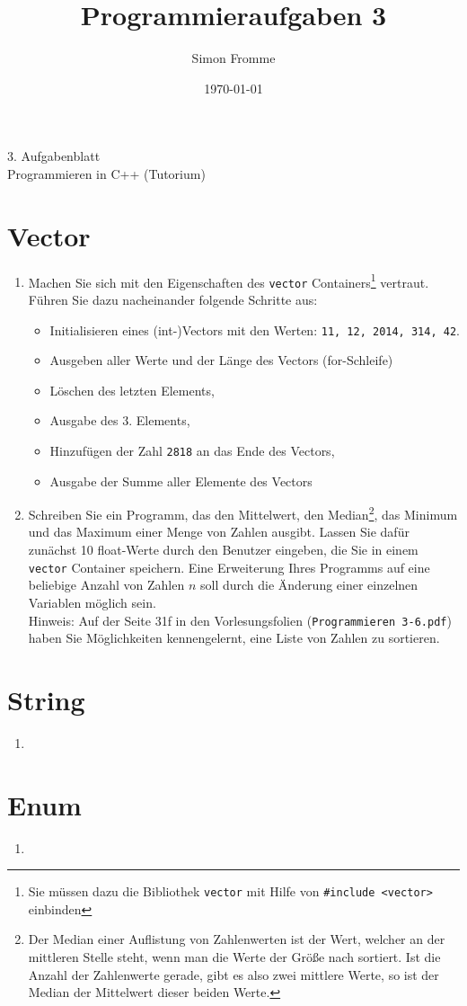 \documentclass[paper=a4, fontsize=11pt, twoside]{scrartcl}
\title{Programmieraufgaben 3}
\author{Simon Fromme}
\date{\normalsize\today}
\begin{document}
\vspace*{0.75\baselineskip}
\begin{center}
  \Large 3. Aufgabenblatt \\\vspace{0.5em} \large Programmieren in C++ (Tutorium)
\end{center}

\section*{Vector}
\begin{enumerate}
\item Machen Sie sich mit den Eigenschaften des \texttt{vector} Containers\footnote{Sie müssen dazu die Bibliothek \texttt{vector} mit Hilfe von \texttt{#include <vector>} einbinden } vertraut. Führen Sie dazu nacheinander folgende Schritte aus:
  \begin{itemize}
  \item Initialisieren eines (int-)Vectors mit den Werten: \texttt{11, 12, 2014, 314, 42}.
  \item Ausgeben aller Werte und der Länge des Vectors (for-Schleife)
  \item Löschen des letzten Elements,
  \item Ausgabe des 3. Elements,
  \item Hinzufügen der Zahl \texttt{2818} an das Ende des Vectors,
  \item Ausgabe der Summe aller Elemente des Vectors
  \end{itemize}

   \item Schreiben Sie ein Programm, das den Mittelwert, den Median\footnote{Der Median einer Auflistung von Zahlenwerten ist der Wert, welcher an der mittleren Stelle steht, wenn man die Werte der Größe nach sortiert. Ist die Anzahl der Zahlenwerte gerade, gibt es also zwei mittlere Werte, so ist der Median der Mittelwert dieser beiden Werte.}, das Minimum und das Maximum einer Menge von Zahlen ausgibt. Lassen Sie dafür zunächst 10 float-Werte durch den Benutzer eingeben, die Sie in einem \texttt{vector} Container speichern. Eine Erweiterung Ihres Programms auf eine beliebige Anzahl von Zahlen $n$ soll durch die Änderung einer einzelnen Variablen möglich sein. \\
Hinweis: Auf der Seite 31f in den Vorlesungsfolien (\texttt{Programmieren 3-6.pdf}) haben Sie Möglichkeiten kennengelernt, eine Liste von Zahlen zu sortieren.
\end{enumerate}

\section*{String}
\begin{enumerate}[resume]
   \item
\end{enumerate}

\section*{Enum}
\begin{enumerate}[resume]
   \item
\end{enumerate}
\end{document}
